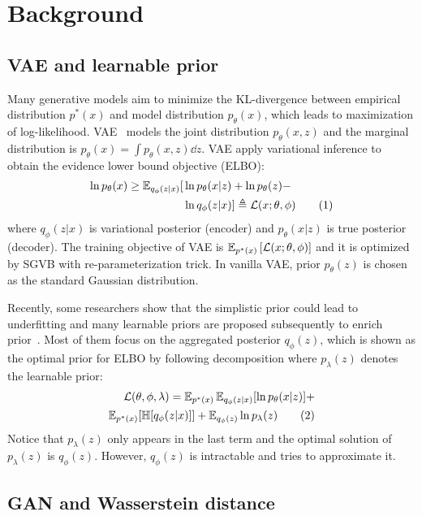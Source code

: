 \section{Background}

\subsection{VAE and learnable prior}

Many generative models aim to minimize the KL-divergence between empirical distribution $p^*(x)$ and model distribution $p_\theta(x)$, which leads to maximization of log-likelihood. VAE~\cite{kingma2014auto} models the joint distribution $p_\theta(x, z)$ and the marginal distribution is $p_\theta(x) = \int p_\theta(x, z) \dd z$. VAE apply variational inference to obtain the evidence lower bound objective (ELBO): 
\begin{align*} \label{eq:ELBO}
\ln p_\theta(x) \geq \operatorname{\mathbb{E}}_{q_\phi(z|x)} [  &  \ln p_\theta(x|z) + \ln p_\theta(z) - \\ & \ln q_\phi(z|x) ] 
\triangleq \mathcal{L}(x; \theta, \phi) \tag{1}
\end{align*}
where $q_\phi(z|x)$ is variational posterior (encoder) and $p_\theta(x|z)$ is true posterior (decoder). The training objective of VAE is $\operatorname{\mathbb{E}}_{{p^*(x)}}\left[{\mathcal{L}(x; \theta, \phi)}\right]$ and it is optimized by SGVB with re-parameterization trick. In vanilla VAE, prior $p_\theta(z)$ is chosen as the standard Gaussian distribution. 

Recently, some researchers show that the simplistic prior could lead to underfitting and many learnable priors are proposed subsequently to enrich prior~\cite{tomczak2018vae}. Most of them focus on the aggregated posterior $q_\phi(z)$, which is shown as the optimal prior for ELBO by following decomposition where $p_\lambda(z)$ denotes the learnable prior:
\begin{align*} \label{eq:second-decomposition}
\mathcal{L}(\theta, \phi, \lambda) = \operatorname{\mathbb{E}}_{p^*(x)}\operatorname{\mathbb{E}}_{q_\phi(z|x)} [ \ln p_\theta(x|z)] + \\ 
\operatorname{\mathbb{E}}_{p^*(x)}[\mathbb{H}[q_\phi(z|x)]] + \operatorname{\mathbb{E}}_{q_\phi(z)} \ln p_\lambda(z) \tag{2}
\end{align*}
Notice that $p_\lambda(z)$ only appears in the last term and the optimal solution of $p_\lambda(z)$ is $q_\phi(z)$. However, $q_\phi(z)$ is intractable and \cite{tomczak2018vae,takahashi2019variational} tries to approximate it. 

\subsection{GAN and Wasserstein distance}

